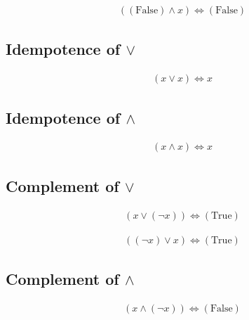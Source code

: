 \begin{prop}
\label{Proposition:land_annihilator_2}
\begin{align*}
((\text{False}) \land x) \iff (\text{False})
\end{align*}
\end{prop}

\subsection{Idempotence of $\lor$}
\begin{prop}
\label{Proposition:lor_idempotence}
\begin{align*}
(x \lor x) \iff x
\end{align*}
\end{prop}

\subsection{Idempotence of $\land$}
\begin{prop}
\label{Proposition:land_idempotence}
\begin{align*}
(x \land x) \iff x
\end{align*}
\end{prop}

\subsection{Complement of $\lor$}
\begin{prop}
\label{Proposition:lor_complement_1}
\begin{align*}
(x \lor (\lnot x)) \iff (\text{True})
\end{align*}
\end{prop}

\begin{prop}
\label{Proposition:lor_complement_2}
\begin{align*}
((\lnot x) \lor x) \iff (\text{True})
\end{align*}
\end{prop}

\subsection{Complement of $\land$}
\begin{prop}
\label{Proposition:land_complement_1}
\begin{align*}
(x \land (\lnot x)) \iff (\text{False})
\end{align*}
\end{prop}

